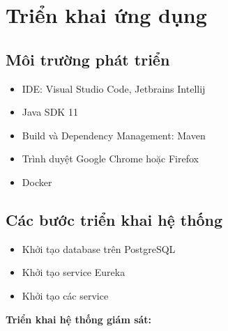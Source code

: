 \documentclass[report.tex]{subfiles}
\begin{document}
\pagebreak
\chapter[Chương 3. Triển khai ứng dụng]{Triển khai ứng dụng}

\section{Môi trường phát triển}

\begin{itemize}
\item IDE: Visual Studio Code, Jetbrains Intellij
\item Java SDK 11
\item Build và Dependency Management: Maven
\item Trình duyệt Google Chrome hoặc Firefox
\item Docker
\end{itemize}

\section{Các bước triển khai hệ thống}

\begin{itemize}
\item Khởi tạo database trên PostgreSQL
\item Khởi tạo service Eureka
\item Khởi tạo các service

\end{itemize}

\textbf{Triển khai hệ thống giám sát:}
\end{document}
